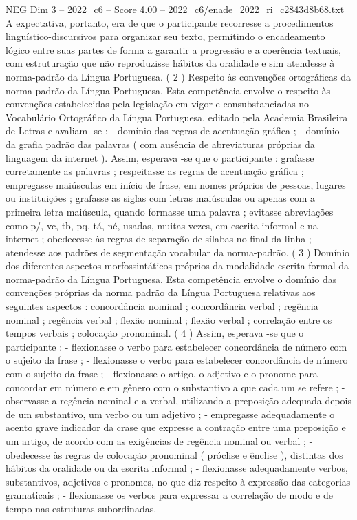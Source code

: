 \begin{textsample}{NEG Dim 3 – 2022\_c6 – Score 4.00 – 2022\_c6/enade\_2022\_ri\_c2843d8b68.txt}
A expectativa, portanto, era de que o participante recorresse a procedimentos linguístico-discursivos para organizar seu texto, permitindo o encadeamento lógico entre suas partes de forma a garantir a progressão e a coerência textuais, com estruturação que não reproduzisse hábitos da oralidade e sim atendesse à norma-padrão da Língua Portuguesa. ( 2 ) Respeito às convenções ortográficas da norma-padrão da Língua Portuguesa.
Esta competência envolve o respeito às convenções estabelecidas pela legislação em vigor e consubstanciadas no Vocabulário Ortográfico da Língua Portuguesa, editado pela Academia Brasileira de Letras e avaliam -se : - domínio das regras de acentuação gráfica ; - domínio da grafia padrão das palavras ( com ausência de abreviaturas próprias da linguagem da internet ).
Assim, esperava -se que o participante : grafasse corretamente as palavras ; respeitasse as regras de acentuação gráfica ; empregasse maiúsculas em início de frase, em nomes próprios de pessoas, lugares ou instituições ; grafasse as siglas com letras maiúsculas ou apenas com a primeira letra maiúscula, quando formasse uma palavra ; evitasse abreviações como p/, vc, tb, pq, tá, né, usadas, muitas vezes, em escrita informal e na internet ; obedecesse às regras de separação de sílabas no final da linha ; atendesse aos padrões de segmentação vocabular da norma-padrão. ( 3 ) Domínio dos diferentes aspectos morfossintáticos próprios da modalidade escrita formal da norma-padrão da Língua Portuguesa.
Esta competência envolve o domínio das convenções próprias da norma padrão da Língua Portuguesa relativas aos seguintes aspectos : concordância nominal ; concordância verbal ; regência nominal ; regência verbal ; flexão nominal ; flexão verbal ; correlação entre os tempos verbais ; colocação pronominal. ( 4 ) Assim, esperava -se que o participante : - flexionasse o verbo para estabelecer concordância de número com o sujeito da frase ; - flexionasse o verbo para estabelecer concordância de número com o sujeito da frase ; - flexionasse o artigo, o adjetivo e o pronome para concordar em número e em gênero com o substantivo a que cada um se refere ; - observasse a regência nominal e a verbal, utilizando a preposição adequada depois de um substantivo, um verbo ou um adjetivo ; - empregasse adequadamente o acento grave indicador da crase que expresse a contração entre uma preposição e um artigo, de acordo com as exigências de regência nominal ou verbal ; - obedecesse às regras de colocação pronominal ( próclise e ênclise ), distintas dos hábitos da oralidade ou da escrita informal ; - flexionasse adequadamente verbos, substantivos, adjetivos e pronomes, no que diz respeito à expressão das categorias gramaticais ; - flexionasse os verbos para expressar a correlação de modo e de tempo nas estruturas subordinadas.

\end{textsample}
